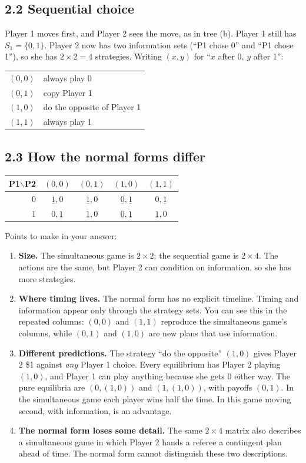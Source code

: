 \documentclass[11pt]{article}
\begin{document}
\subsection*{2.2 Sequential choice}
Player 1 moves first, and Player 2 sees the move, as in tree (b). Player 1 still has $S_1=\{0,1\}$. Player 2 now has two information sets (``P1 chose 0'' and ``P1 chose 1''), so she has $2\times2=4$ strategies. Writing $(x,y)$ for ``$x$ after 0, $y$ after 1'':
\begin{center}
\begin{tabular}{cl}
$(0,0)$ & always play 0 \\
$(0,1)$ & copy Player 1 \\
$(1,0)$ & do the opposite of Player 1 \\
$(1,1)$ & always play 1
\end{tabular}
\end{center}

\subsection*{2.3 How the normal forms differ}
\begin{center}
\begin{tabular}{r|cccc}
P1$\backslash$P2 & $(0,0)$ & $(0,1)$ & $(1,0)$ & $(1,1)$ \\ \hline
$0$ & $\underline{1},0$ & $\underline{1},0$ & $\underline{0},\underline{1}$ & $0,\underline{1}$ \\
$1$ & $0,\underline{1}$ & $\underline{1},0$ & $\underline{0},\underline{1}$ & $\underline{1},0$
\end{tabular}
\end{center}
Points to make in your answer:
\begin{enumerate}
\item \textbf{Size.} The simultaneous game is $2\times2$; the sequential game is $2\times4$. The actions are the same, but Player 2 can condition on information, so she has more strategies.
\item \textbf{Where timing lives.} The normal form has no explicit timeline. Timing and information appear only through the strategy sets. You can see this in the repeated columns: $(0,0)$ and $(1,1)$ reproduce the simultaneous game's columns, while $(0,1)$ and $(1,0)$ are new plans that use information.
\item \textbf{Different predictions.} The strategy ``do the opposite'' $(1,0)$ gives Player 2 \$1 against \emph{any} Player 1 choice. Every equilibrium has Player 2 playing $(1,0)$, and Player 1 can play anything because she gets 0 either way. The pure equilibria are $(0,(1,0))$ and $(1,(1,0))$, with payoffs $(0,1)$. In the simultaneous game each player wins half the time. In this game moving second, with information, is an advantage.
\item \textbf{The normal form loses some detail.} The same $2\times4$ matrix also describes a simultaneous game in which Player 2 hands a referee a contingent plan ahead of time. The normal form cannot distinguish these two descriptions.
\end{enumerate}
\end{document}
